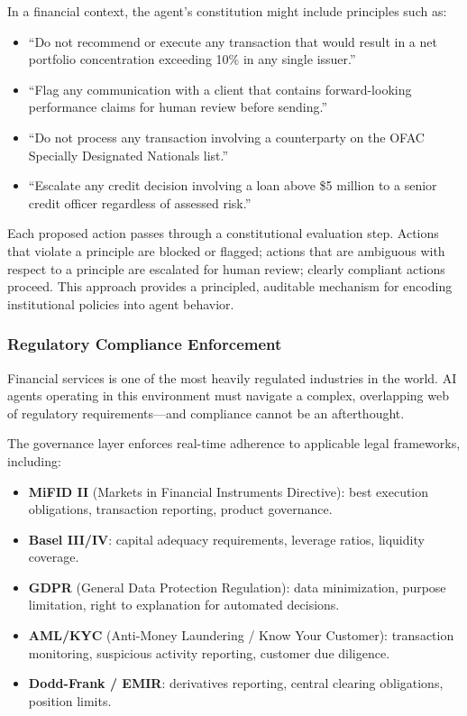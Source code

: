 \documentclass{article}
\begin{document}
In a financial context, the agent's constitution might include principles such as:
\begin{itemize}
  \item ``Do not recommend or execute any transaction that would result in a net portfolio concentration exceeding 10\% in any single issuer.''
  \item ``Flag any communication with a client that contains forward-looking performance claims for human review before sending.''
  \item ``Do not process any transaction involving a counterparty on the OFAC Specially Designated Nationals list.''
  \item ``Escalate any credit decision involving a loan above \$5 million to a senior credit officer regardless of assessed risk.''
\end{itemize}

Each proposed action passes through a constitutional evaluation step. Actions that violate a principle are blocked or flagged; actions that are ambiguous with respect to a principle are escalated for human review; clearly compliant actions proceed. This approach provides a principled, auditable mechanism for encoding institutional policies into agent behavior.

\subsubsection{Regulatory Compliance Enforcement}

Financial services is one of the most heavily regulated industries in the world. AI agents operating in this environment must navigate a complex, overlapping web of regulatory requirements—and compliance cannot be an afterthought.

The governance layer enforces real-time adherence to applicable legal frameworks, including:

\begin{itemize}
  \item \textbf{MiFID II} (Markets in Financial Instruments Directive): best execution obligations, transaction reporting, product governance.
  \item \textbf{Basel III/IV}: capital adequacy requirements, leverage ratios, liquidity coverage.
  \item \textbf{GDPR} (General Data Protection Regulation): data minimization, purpose limitation, right to explanation for automated decisions.
  \item \textbf{AML/KYC} (Anti-Money Laundering / Know Your Customer): transaction monitoring, suspicious activity reporting, customer due diligence.
  \item \textbf{Dodd-Frank / EMIR}: derivatives reporting, central clearing obligations, position limits.
\end{itemize}
\end{document}
